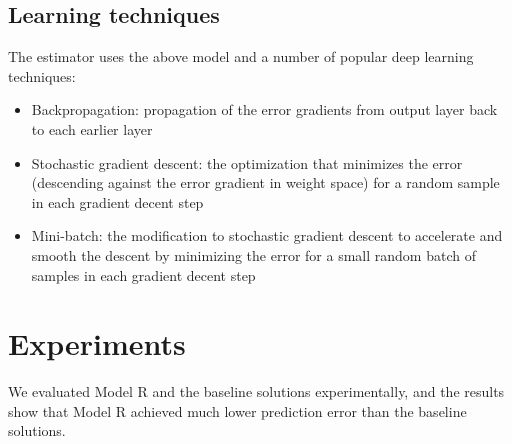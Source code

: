 \documentclass[letterpaper]{article}
\begin{document}
\subsection{Learning techniques}
The estimator uses the above model and a number of popular deep learning 
techniques:
\begin{itemize}
	\item Backpropagation: propagation of the error gradients from output layer 
	back to each earlier layer \cite{rumelhart1988learning}
	\item Stochastic gradient descent: the optimization that minimizes 
	the error (descending against the error gradient in weight space) for a 
	random sample in each gradient decent step \cite{lecun2012efficient}
	\item Mini-batch: the modification to stochastic gradient descent to 
	accelerate and smooth the descent by minimizing the error for a small 
	random batch of samples in each gradient decent step \cite{mairal2010online}
\end{itemize}

\section{Experiments}
We evaluated Model R and the baseline solutions experimentally,
and the results show that Model R achieved much lower prediction error than 
the baseline solutions.
\end{document}
